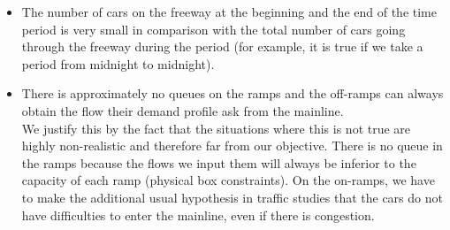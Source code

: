 \begin{itemize}
	\item The number of cars on the freeway at the beginning and the end of the time period is very small in comparison with the total number of cars going through the freeway during the period (for example, it is true if we take a period from midnight to midnight).
	\item There is approximately no queues on the ramps and the off-ramps can always obtain the flow their demand profile ask from the mainline.\\
	 We justify this by the fact that the situations where this is not true are highly non-realistic and therefore far from our objective. There is no queue in the ramps because the flows we input them will always be inferior to the capacity of each ramp (physical box constraints). On the on-ramps, we have to make the additional usual hypothesis in traffic studies that the cars do not have difficulties to enter the mainline, even if there is congestion.
\end{itemize}
